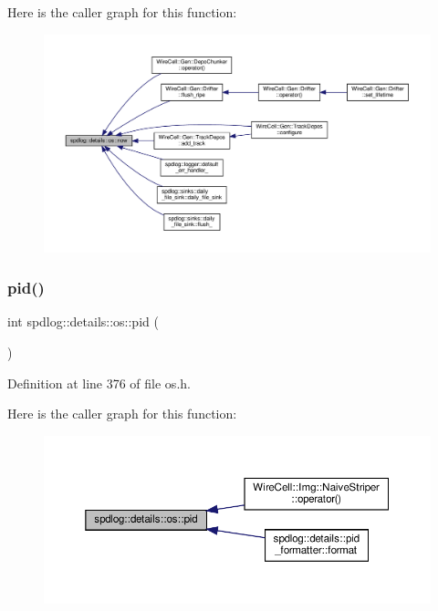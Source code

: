 Here is the caller graph for this function\+:
\nopagebreak
\begin{figure}[H]
\begin{center}
\leavevmode
\includegraphics[width=350pt]{namespacespdlog_1_1details_1_1os_ab86a7d9f1495a0edae71ce647bae6a66_icgraph}
\end{center}
\end{figure}
\mbox{\label{namespacespdlog_1_1details_1_1os_afa5e2f0096ec0aa63c2d20143cb18b17}} 
\subsubsection{\texorpdfstring{pid()}{pid()}}
{\footnotesize\ttfamily int spdlog\+::details\+::os\+::pid (\begin{DoxyParamCaption}{ }\end{DoxyParamCaption})\hspace{0.3cm}{\ttfamily [inline]}}



Definition at line 376 of file os.\+h.

Here is the caller graph for this function\+:
\nopagebreak
\begin{figure}[H]
\begin{center}
\leavevmode
\includegraphics[width=350pt]{namespacespdlog_1_1details_1_1os_afa5e2f0096ec0aa63c2d20143cb18b17_icgraph}
\end{center}
\end{figure}
\mbox{\label{namespacespdlog_1_1details_1_1os_a58e68538bb3667c56f3623bf047093d6}} 
